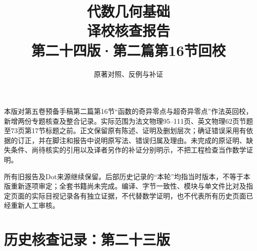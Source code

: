 
\newcommand{\RR}{\mathcal R}
\newcommand{\FF}{\mathcal F}
\newcommand{\GG}{\mathcal G}
\newcommand{\MM}{\mathcal M}
\newcommand{\JJ}{\mathcal J}
\newcommand{\oldauditsrc}[1]{\par\noindent\textbf{原文位置：}#1。\par}
\newcommand{\kind}[2]{\noindent\textbf{分类：#1。}\ #2\par}
\newcommand{\lead}[1]{\par\noindent\textbf{#1}\quad}
\newenvironment{analysisproof}{\par\noindent\textbf{该轮核查的反例或补证。}\ }{\par}

\title{代数几何基础\\译校核查报告\\[1em]\large 第二十四版·第二篇第16节回校}
\author{原著对照、反例与补证}
\date{}

\frontmatter
\maketitle
{}
本版对第五卷预备手稿第二篇第16节“函数的奇异零点与超奇异零点”作法英回校，新增两份专题核查及整合记录。实际范围为法文物理95--111页、英文物理62页节题至73页第17节标题之前。正文保留原有陈述、证明及删划层次；确证错误采用有依据的订正，并在脚注和报告中说明原写法、错误归属及理由。未完成的原证明、缺失条件、尚待核实的引用以及译者另作的补证分别明示，不把工程检查当作数学证明。

所有旧报告及Dot来源继续保留。后部历史记录的“本轮”均指当时版本，不等于本版重新逐项审定；全套书籍尚未完成。编译、字节一致性、模块与单文件比对及指定页面的实际目视记录各有独立证据，不代替数学证明，也不代表所有历史页面已经重新人工审核。

\tableofcontents
\mainmatter



\setcounter{secnumdepth}{-2}
\part{历史核查记录：第二十三版}
\setcounter{secnumdepth}{2}



\setcounter{secnumdepth}{-2}
